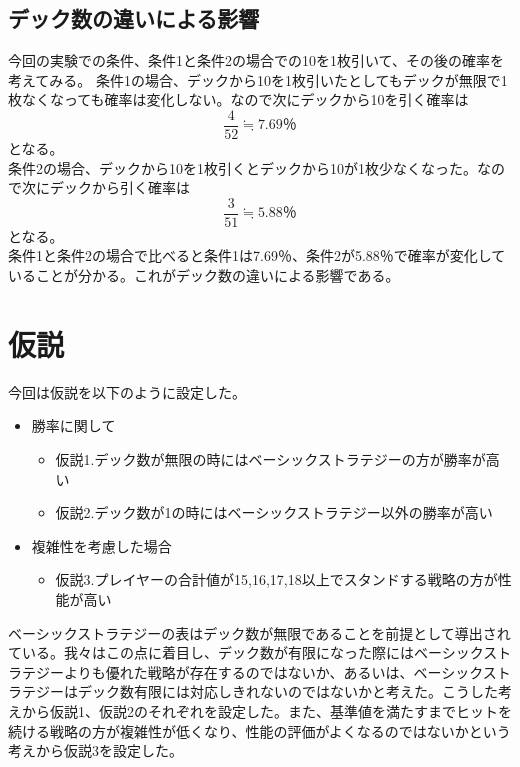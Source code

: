 \subsection{デック数の違いによる影響}
今回の実験での条件、条件1と条件2の場合での10を1枚引いて、その後の確率を考えてみる。
条件1の場合、デックから10を1枚引いたとしてもデックが無限で1枚なくなっても確率は変化しない。なので次にデックから10を引く確率は\begin{equation}\frac{4}{52} \fallingdotseq 7.69％\end{equation}となる。\\
条件2の場合、デックから10を1枚引くとデックから10が1枚少なくなった。なので次にデックから引く確率は\begin{equation}\frac{3}{51}\fallingdotseq5.88％\end{equation}となる。\\
条件1と条件2の場合で比べると条件1は7.69％、条件2が5.88％で確率が変化していることが分かる。これがデック数の違いによる影響である。

\section{仮説}
今回は仮説を以下のように設定した。
\begin{itemize}
\item 勝率に関して
    \begin{itemize}
        \item 仮説1.デック数が無限の時にはベーシックストラテジーの方が勝率が高い
        \item 仮説2.デック数が1の時にはベーシックストラテジー以外の勝率が高い
    \end{itemize}
\item 複雑性を考慮した場合
    \begin{itemize}
        \item 仮説3.プレイヤーの合計値が15,16,17,18以上でスタンドする戦略の方が性能が高い
    \end{itemize}
\end{itemize}
ベーシックストラテジーの表はデック数が無限であることを前提として導出されている。我々はこの点に着目し、デック数が有限になった際にはベーシックストラテジーよりも優れた戦略が存在するのではないか、あるいは、ベーシックストラテジーはデック数有限には対応しきれないのではないかと考えた。こうした考えから仮説1、仮説2のそれぞれを設定した。また、基準値を満たすまでヒットを続ける戦略の方が複雑性が低くなり、性能の評価がよくなるのではないかという考えから仮説3を設定した。

